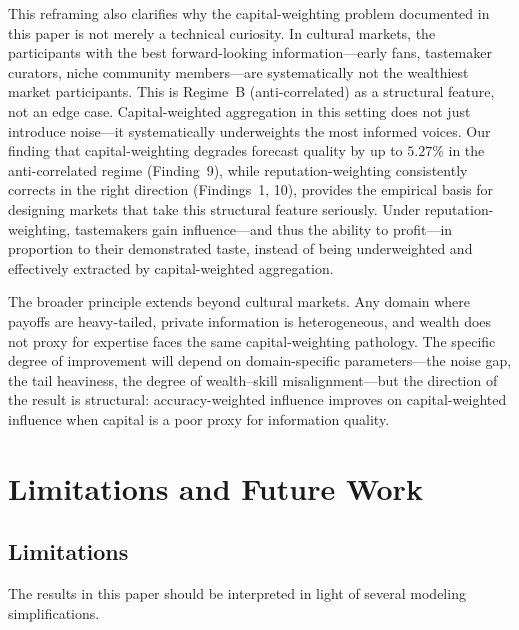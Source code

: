 \documentclass[conference]{IEEEtran}
\begin{document}
This reframing also clarifies why the capital-weighting problem documented in this paper is not merely a technical curiosity. In cultural markets, the participants with the best forward-looking information---early fans, tastemaker curators, niche community members---are systematically not the wealthiest market participants. This is Regime~B (anti-correlated) as a structural feature, not an edge case. Capital-weighted aggregation in this setting does not just introduce noise---it systematically underweights the most informed voices. Our finding that capital-weighting degrades forecast quality by up to $5.27\%$ in the anti-correlated regime (Finding~9), while reputation-weighting consistently corrects in the right direction (Findings~1, 10), provides the empirical basis for designing markets that take this structural feature seriously. Under reputation-weighting, tastemakers gain influence---and thus the ability to profit---in proportion to their demonstrated taste, instead of being underweighted and effectively extracted by capital-weighted aggregation.

The broader principle extends beyond cultural markets. Any domain where payoffs are heavy-tailed, private information is heterogeneous, and wealth does not proxy for expertise faces the same capital-weighting pathology. The specific degree of improvement will depend on domain-specific parameters---the noise gap, the tail heaviness, the degree of wealth--skill misalignment---but the direction of the result is structural: accuracy-weighted influence improves on capital-weighted influence when capital is a poor proxy for information quality.

\section{Limitations and Future Work}
\label{sec:limitations}

\subsection{Limitations}
\label{sec:limitations-limits}

The results in this paper should be interpreted in light of several modeling simplifications.
\end{document}
